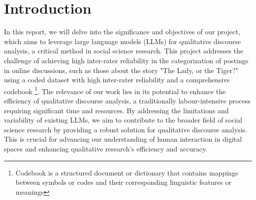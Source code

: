 \documentclass[fleqn,moreauthors,10pt]{ds_report}
\affiliation{\textit{Advisors: Slavko Žitnik}}
\begin{document}
\flushbottom 

\maketitle 

\thispagestyle{empty} 


\section*{Introduction}
	
In this report, we will delve into the significance and objectives of our project, which aims to leverage large language models (LLMs) for qualitative discourse analysis, a critical method in social science research. This project addresses the challenge of achieving high inter-rater reliability in the categorization of postings in online discussions, such as those about the story "The Lady, or the Tiger?" using a coded dataset with high inter-rater
reliability and a comprehensive codebook \footnote{Codebook is a structured document or dictionary that contains mappings between symbols or codes and their corresponding linguistic features or meanings}. The relevance of our work lies in its potential to enhance the efficiency of qualitative discourse analysis, a traditionally labour-intensive process requiring significant time and resources. By addressing the limitations and variability of existing LLMs, we aim to contribute to the broader field of social science research by providing a robust solution for qualitative discourse analysis. This is crucial for advancing our understanding of human interaction in digital spaces and enhancing qualitative research's efficiency and accuracy.
\end{document}
